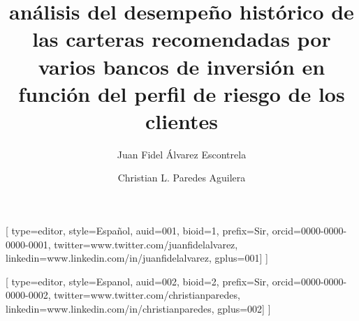 \let\WriteBookmarks\relax
\def\floatpagepagefraction{1}
\def\textpagefraction{.001}



\title[mode = title]{análisis del desempeño histórico de las carteras recomendadas por varios bancos de inversión en función del perfil de riesgo de los clientes}  

\tnotemark[1] 


%

\author[1,2]{Juan Fidel Álvarez Escontrela}[
    type=editor,
	style=Español,
	auid=001,
	bioid=1,
	prefix=Sir,
	orcid=0000-0000-0000-0001,
	twitter=www.twitter.com/juanfidelalvarez,
	linkedin=www.linkedin.com/in/juanfidelalvarez,
	gplus=001]
]
\cormark[1]

\fnmark[1]





\author[2]{Christian L. Paredes Aguilera}[%
	type=editor,
	style=Espanol,
	auid=002,
	bioid=2,
	prefix=Sir,
	orcid=0000-0000-0000-0002,
	twitter=www.twitter.com/christianparedes,
	linkedin=www.linkedin.com/in/christianparedes,
	gplus=002]
]

